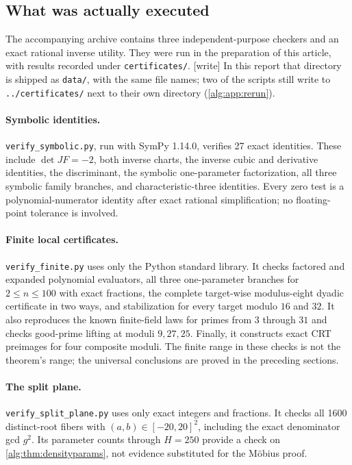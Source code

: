 \documentclass[11pt]{article}
\numberwithin{equation}{section}
\theoremstyle{plain}
\theoremstyle{plain}
\theoremstyle{plain}
\theoremstyle{definition}
\theoremstyle{definition}
\theoremstyle{definition}
\theoremstyle{remark}
\newcommand{\wtag}{\textup{[write]}}%
\newcommand{\rpath}[1]{\nolinkurl{#1}}
\begin{document}
\subsection{What was actually executed}
The accompanying archive contains three independent-purpose checkers and
an exact rational inverse utility. They were run in the preparation of this
article, with results recorded under \texttt{certificates/}.
\wtag{} In this report that directory is shipped as \rpath{data/}, with
the same file names; two of the scripts still write to
\rpath{../certificates/} next to their own directory
(\cref{alg:app:rerun}).

\paragraph{Symbolic identities.}
\texttt{verify\_symbolic.py}, run with SymPy 1.14.0, verifies 27 exact
identities. These include $\det JF=-2$, both inverse charts, the inverse
cubic and derivative identities, the discriminant, the symbolic
one-parameter factorization, all three symbolic family branches, and
characteristic-three identities. Every zero test is a polynomial-numerator
identity after exact rational simplification; no floating-point tolerance
is involved.

\paragraph{Finite local certificates.}
\texttt{verify\_finite.py} uses only the Python standard library. It checks
factored and expanded polynomial evaluators, all three one-parameter
branches for $2\le n\le100$ with exact fractions, the complete target-wise
modulus-eight dyadic certificate in two ways, and stabilization for every
target modulo $16$ and $32$. It also reproduces the known finite-field laws
for primes from $3$ through $31$ and checks good-prime lifting at moduli
$9,27,25$. Finally, it constructs exact CRT preimages for four composite
moduli. The finite range in these checks is not the theorem's range;
the universal conclusions are proved in the preceding sections.

\paragraph{The split plane.}
\texttt{verify\_split\_plane.py} uses only exact integers and fractions.
It checks all 1600 distinct-root fibers with $(a,b)\in[-20,20]^2$,
including the exact denominator gcd $g^2$. Its parameter counts through
$H=250$ provide a check on \cref{alg:thm:densityparams}, not evidence substituted
for the M\"obius proof.
\end{document}
